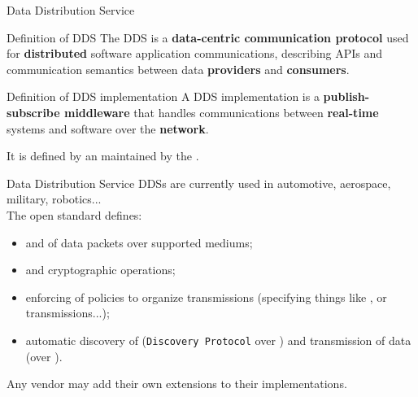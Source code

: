 \begin{frame}{Data Distribution Service}
	\begin{block}{Definition of DDS}
		The DDS is a \textbf{data-centric communication protocol} used for \textbf{distributed} software application communications, describing APIs and communication semantics between data \textbf{providers} and \textbf{consumers}.
	\end{block}
	\begin{block}{Definition of DDS implementation}
		A DDS implementation is a \textbf{publish-subscribe middleware} that handles communications between \textbf{real-time} systems and software over the \textbf{network}.
	\end{block}
	It is defined by an \href{https://www.omg.org/spec/DDS/About-DDS/}{} maintained by the .
\end{frame}
\begin{frame}{Data Distribution Service}
	DDSs are currently used in automotive, aerospace, military, robotics...\\
	\bigskip
	The open standard defines:
	\begin{itemize}
		\item {} and  of data packets over supported mediums;
		\item {} and cryptographic operations;
		\item enforcing of  policies to organize transmissions (specifying things like ,  or  transmissions...);
		\item automatic discovery of  (\texttt{Discovery Protocol} over ) and transmission of data (over ).
	\end{itemize}
	\bigskip
	Any vendor may add their own extensions to their implementations.
\end{frame}
